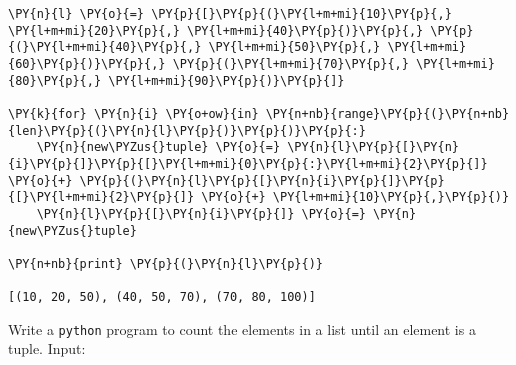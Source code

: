 \begin{Answer}
\begin{tcolorbox}[size=fbox, boxrule=1pt, colback=cellbackground, colframe=cellborder]
\begin{Verbatim}[commandchars=\\\{\}]
\PY{n}{l} \PY{o}{=} \PY{p}{[}\PY{p}{(}\PY{l+m+mi}{10}\PY{p}{,} \PY{l+m+mi}{20}\PY{p}{,} \PY{l+m+mi}{40}\PY{p}{)}\PY{p}{,} \PY{p}{(}\PY{l+m+mi}{40}\PY{p}{,} \PY{l+m+mi}{50}\PY{p}{,} \PY{l+m+mi}{60}\PY{p}{)}\PY{p}{,} \PY{p}{(}\PY{l+m+mi}{70}\PY{p}{,} \PY{l+m+mi}{80}\PY{p}{,} \PY{l+m+mi}{90}\PY{p}{)}\PY{p}{]}

\PY{k}{for} \PY{n}{i} \PY{o+ow}{in} \PY{n+nb}{range}\PY{p}{(}\PY{n+nb}{len}\PY{p}{(}\PY{n}{l}\PY{p}{)}\PY{p}{)}\PY{p}{:}
    \PY{n}{new\PYZus{}tuple} \PY{o}{=} \PY{n}{l}\PY{p}{[}\PY{n}{i}\PY{p}{]}\PY{p}{[}\PY{l+m+mi}{0}\PY{p}{:}\PY{l+m+mi}{2}\PY{p}{]} \PY{o}{+} \PY{p}{(}\PY{n}{l}\PY{p}{[}\PY{n}{i}\PY{p}{]}\PY{p}{[}\PY{l+m+mi}{2}\PY{p}{]} \PY{o}{+} \PY{l+m+mi}{10}\PY{p}{,}\PY{p}{)}
    \PY{n}{l}\PY{p}{[}\PY{n}{i}\PY{p}{]} \PY{o}{=} \PY{n}{new\PYZus{}tuple}
    
\PY{n+nb}{print} \PY{p}{(}\PY{n}{l}\PY{p}{)}

[(10, 20, 50), (40, 50, 70), (70, 80, 100)]
\end{Verbatim}
\end{tcolorbox} 
\end{Answer}

\begin{Exercise}
Write a \texttt{python} program to count the elements in a list until an element is a tuple.
Input:
\begin{Shaded}
\begin{Highlighting}[]
\NormalTok{\{[}\NormalTok{, }\NormalTok{, (}\NormalTok{,}\NormalTok{:}\NormalTok{\}]\}}
\end{Highlighting}
\end{Shaded}
\end{Exercise}

